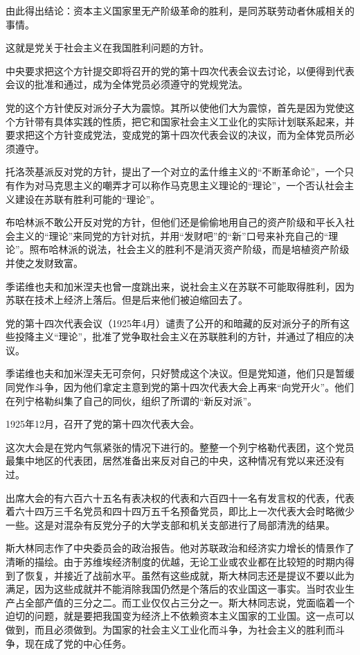 由此得出结论：资本主义国家里无产阶级革命的胜利，是同苏联劳动者休戚相关的事情。

这就是党关于社会主义在我国胜利问题的方针。

中央要求把这个方针提交即将召开的党的第十四次代表会议去讨论，以便得到代表会议的批准和通过，成为全体党员必须遵守的党规党法。

党的这个方针使反对派分子大为震惊。其所以使他们大为震惊，首先是因为党使这个方针带有具体实践的性质，把它和国家社会主义工业化的实际计划联系起来，并要求把这个方针变成党法，变成党的第十四次代表会议的决议，而为全体党员所必须遵守。

托洛茨基派反对党的方针，提出了一个对立的孟什维主义的“不断革命论”，一个只有作为对马克思主义的嘲弄才可以称作马克思主义理论的“理论”，一个否认社会主义建设在苏联有胜利可能的“理论”。

布哈林派不敢公开反对党的方针，但他们还是偷偷地用自己的资产阶级和平长入社会主义的“理论”来同党的方针对抗，并用“发财吧”的“新”口号来补充自己的“理论”。照布哈林派的说法，社会主义的胜利不是消灭资产阶级，而是培植资产阶级并使之发财致富。

季诺维也夫和加米涅夫也曾一度跳出来，说社会主义在苏联不可能取得胜利，因为苏联在技术上经济上落后。但是后来他们被迫缩回去了。

党的第十四次代表会议（1925年4月）谴责了公开的和暗藏的反对派分子的所有这些投降主义“理论”，批准了党争取社会主义在苏联胜利的方针，并通过了相应的决议。

季诺维也夫和加米涅夫无可奈何，只好赞成这个决议。但是党知道，他们只是暂缓同党作斗争，因为他们拿定主意到党的第十四次代表大会上再来“向党开火”。他们在列宁格勒纠集了自己的同伙，组织了所谓的“新反对派”。

1925年12月，召开了党的第十四次代表大会。

这次大会是在党内气氛紧张的情况下进行的。整整一个列宁格勒代表团，这个党员最集中地区的代表团，居然准备出来反对自己的中央，这种情况有党以来还没有过。

出席大会的有六百六十五名有表决权的代表和六百四十一名有发言权的代表，代表着六十四万三千名党员和四十四万五千名预备党员，即比上一次代表大会时略微少一些。这是对混杂有反党分子的大学支部和机关支部进行了局部清洗的结果。

斯大林同志作了中央委员会的政治报告。他对苏联政治和经济实力增长的情景作了清晰的描绘。由于苏维埃经济制度的优越，无论工业或农业都在比较短的时期内得到了恢复，并接近了战前水平。虽然有这些成就，斯大林同志还是提议不要以此为满足，因为这些成就并不能消除我国仍然是个落后的农业国这一事实。当时农业生产占全部产值的三分之二。而工业仅仅占三分之一。斯大林同志说，党面临着一个迫切的问题，就是要把我国变为经济上不依赖资本主义国家的工业国。这一点可以做到，而且必须做到。为国家的社会主义工业化而斗争，为社会主义的胜利而斗争，现在成了党的中心任务。

